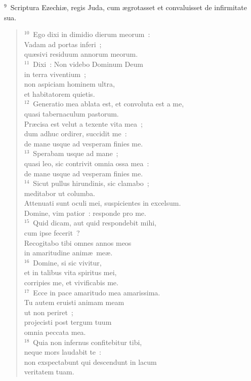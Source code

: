 ${}^{9}$~Scriptura Ezechi\ae , regis Juda, cum \ae grotasset et convaluisset de infirmitate sua.
\begin{verse}${}^{10}$~Ego dixi in dimidio dierum meorum~:\\ Vadam ad portas inferi~;\\ qu\ae sivi residuum annorum meorum.\\
${}^{11}$~Dixi~: Non videbo Dominum Deum\\ in terra viventium~;\\ non aspiciam hominem ultra,\\ et habitatorem quietis.\\
${}^{12}$~Generatio mea ablata est, et convoluta est a me,\\ quasi tabernaculum pastorum.\\ Pr\ae cisa est velut a texente vita mea~;\\ dum adhuc ordirer, succidit me~:\\ de mane usque ad vesperam finies me.\\
${}^{13}$~Sperabam usque ad mane~;\\ quasi leo, sic contrivit omnia ossa mea~:\\ de mane usque ad vesperam finies me.\\
${}^{14}$~Sicut pullus hirundinis, sic clamabo~;\\ meditabor ut columba.\\ Attenuati sunt oculi mei, suspicientes in excelsum.\\ Domine, vim patior~: responde pro me.\\
${}^{15}$~Quid dicam, aut quid respondebit mihi,\\ cum ipse fecerit~?\\ Recogitabo tibi omnes annos meos\\ in amaritudine anim\ae\ me\ae .\\
${}^{16}$~Domine, si sic vivitur,\\ et in talibus vita spiritus mei,\\ corripies me, et vivificabis me.\\
${}^{17}$~Ecce in pace amaritudo mea amarissima.\\ Tu autem eruisti animam meam\\ ut non periret~;\\ projecisti post tergum tuum\\ omnia peccata mea.\\
${}^{18}$~Quia non infernus confitebitur tibi,\\ neque mors laudabit te~:\\ non exspectabunt qui descendunt in lacum\\ veritatem tuam.\\

\end{verse}

